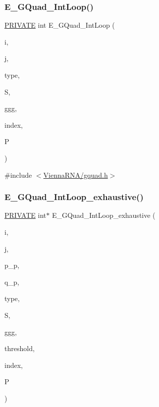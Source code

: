 \subsubsection{\texorpdfstring{E\+\_\+\+G\+Quad\+\_\+\+Int\+Loop()}{E\_GQuad\_IntLoop()}}
{\footnotesize\ttfamily \mbox{\hyperlink{group__utils_ga5e151c615eda34903514212f05a5ccf8}{P\+R\+I\+V\+A\+TE}} int E\+\_\+\+G\+Quad\+\_\+\+Int\+Loop (\begin{DoxyParamCaption}\item[{int}]{i,  }\item[{int}]{j,  }\item[{int}]{type,  }\item[{short $\ast$}]{S,  }\item[{int $\ast$}]{ggg,  }\item[{int $\ast$}]{index,  }\item[{\mbox{\hyperlink{group__energy__parameters_ga8a69ca7d787e4fd6079914f5343a1f35}{vrna\+\_\+param\+\_\+t}} $\ast$}]{P }\end{DoxyParamCaption})}



{\ttfamily \#include $<$\mbox{\hyperlink{gquad_8h}{Vienna\+R\+N\+A/gquad.\+h}}$>$}

\mbox{\label{group__gquads_ga27fc69fa7832e2ddf910696958f729a0}} 
\subsubsection{\texorpdfstring{E\+\_\+\+G\+Quad\+\_\+\+Int\+Loop\+\_\+exhaustive()}{E\_GQuad\_IntLoop\_exhaustive()}}
{\footnotesize\ttfamily \mbox{\hyperlink{group__utils_ga5e151c615eda34903514212f05a5ccf8}{P\+R\+I\+V\+A\+TE}} int$\ast$ E\+\_\+\+G\+Quad\+\_\+\+Int\+Loop\+\_\+exhaustive (\begin{DoxyParamCaption}\item[{int}]{i,  }\item[{int}]{j,  }\item[{int $\ast$$\ast$}]{p\+\_\+p,  }\item[{int $\ast$$\ast$}]{q\+\_\+p,  }\item[{int}]{type,  }\item[{short $\ast$}]{S,  }\item[{int $\ast$}]{ggg,  }\item[{int}]{threshold,  }\item[{int $\ast$}]{index,  }\item[{\mbox{\hyperlink{group__energy__parameters_ga8a69ca7d787e4fd6079914f5343a1f35}{vrna\+\_\+param\+\_\+t}} $\ast$}]{P }\end{DoxyParamCaption})}




